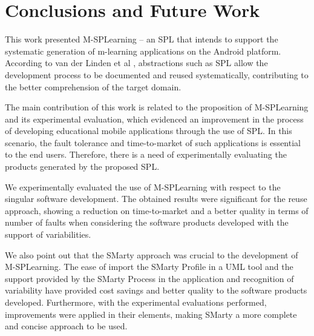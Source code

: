 \section{Conclusions and Future Work}\label{section6}
 
This work presented M-SPLear\allowbreak ning -- an SPL that intends to support the systematic generation of m-learning applications on the Android platform. According to van der Linden et al \cite{vanderlinden07}, abstractions such as SPL allow the development process to be documented and reused systematically, contributing to the better comprehension of the target domain.

The main contribution of this work is related to the proposition of M-SPLearning and its experimental evaluation, which evidenced an improvement in the process of developing educational mobile applications through the use of SPL. In this scenario, the fault tolerance and time-to-market of such applications is essential to the end users. Therefore, there is a need of experimentally evaluating the products generated by the proposed SPL.

We experimentally evaluated the use of M-SPLear\allowbreak ning with respect to the singular software development. The obtained results were significant for the reuse approach, showing a reduction on time-to-market and a better quality in terms of number of faults when considering the software products developed with the support of variabilities. 

We also point out that the SMarty approach was crucial to the development of M-SPLear\allowbreak ning. The ease of import the SMarty Profile in a UML tool and the support provided by the SMarty Process in the application and recognition of variability have provided cost savings and better quality to the software products developed. Furthermore, with the experimental evaluations performed, improvements were applied in their elements, making SMarty a more complete and concise approach to be used. %

